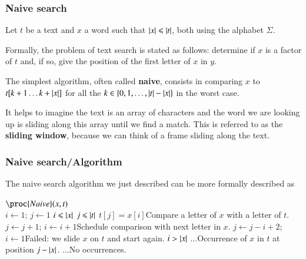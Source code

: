 
%
\begin{frame}
\frametitle{Naive search}

Let \(t\) be a text and \(x\) a word such that \(\lvert{x}\lvert{} \leqslant
\lvert{t}\lvert{}\), both using the alphabet \(\Sigma\).

\bigskip

Formally, the problem of text search is stated as follows: determine
if \(x\) is a factor of \(t\) and, if so, give the position of the
first letter of \(x\) in \(y\).

\bigskip

The simplest algorithm, often called \textbf{naive}, consists in
comparing \(x\) to \(t[k+1 \dots k+\lvert{x}\lvert{}]\) for all the \(k \in \{0,
1, \dots, \lvert{t}\lvert{} - \lvert{x}\lvert{}\}\) in the worst case.

\bigskip

It helps to imagine the text is an array of characters and the word we
are looking up is sliding along this array until we find a match. This
is referred to as the \textbf{sliding window}, because we can think of
a frame sliding along the text.

\end{frame}

%
\begin{frame}
\frametitle{Naive search/Algorithm}

The naive search algorithm we just described can be more formally
described as
{\footnotesize
\begin{codebox}
\(\proc{Naive} (x, t)\)\\
\li \(i \gets 1\); \(j \gets 1\)
\li \While \(i \leqslant \lvert{x}\lvert{}\) \LogAnd \(j \leqslant \lvert{t}\lvert{}\)
\li \Do \If \(t[j] = x[i]\)\>\>\>\>\>\>\>\>\Comment Compare a letter of \(x\) with a letter
of \(t\).
\li \Then \(j \gets j + 1\); \(i \gets i + 1\)\>\>\>\>\>\>\Comment Schedule comparison with next letter in \(x\).
\li \Else \(j \gets j - i + 2\); \(i \gets 1\)\>\>\>\>\>\>\Comment Failed: we slide \(x\) on \(t\) and start again.\End \End
\li \If \(i > \lvert{x}\lvert{}\)
\li \Then \(\ldots\)\>\>\>\>\>\>\>\>\Comment Occurrence of \(x\) in \(t\) at position \(j - \lvert{x}\lvert{}\).
\li \Else \(\ldots\)\>\>\>\>\>\>\>\>\Comment No occurrences. \End
\end{codebox}
}

\end{frame}


